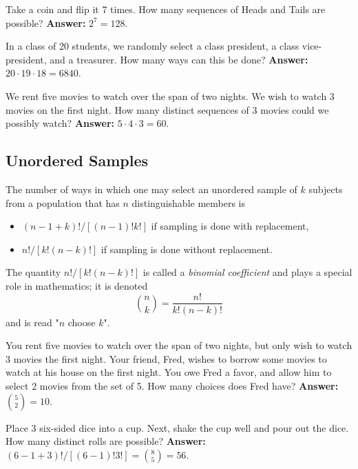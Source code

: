 Take a coin and flip it 7 times. How many sequences of Heads and Tails
are possible? \textbf{Answer:} \(2^{7}=128\).



In a class of 20 students, we randomly select a class president, a
class vice-president, and a treasurer. How many ways can this be
done? \textbf{Answer:} \(20\cdot19\cdot18=6840\).



We rent five movies to watch over the span of two nights. We wish to
watch 3 movies on the first night. How many distinct sequences of 3
movies could we possibly watch? \textbf{Answer:} \(5\cdot4\cdot3=60\).

\subsection{Unordered Samples}
\label{sec-4-5-2}

\begin{prop}
The number of ways in which one may select an unordered sample of
\(k\) subjects from a population that has \(n\) distinguishable
members is
\begin{itemize}
\item \((n-1+k)!/[(n-1)!k!]\) if sampling is done with replacement,
\item \(n!/[k!(n-k)!]\) if sampling is done without replacement.
\end{itemize}
\end{prop}

The quantity \(n!/[k!(n-k)!]\) is called a \emph{binomial coefficient} and
plays a special role in mathematics; it is denoted  
\begin{equation}
\label{eq-binomial-coefficient}
{n \choose k}=\frac{n!}{k!(n-k)!}
\end{equation}
and is read "\(n\) choose \(k\)".


You rent five movies to watch over the span of two nights, but only
wish to watch 3 movies the first night. Your friend, Fred, wishes to
borrow some movies to watch at his house on the first night. You owe
Fred a favor, and allow him to select 2 movies from the set of 5. How
many choices does Fred have? \textbf{Answer:} \({5 \choose 2}=10\).



Place 3 six-sided dice into a cup. Next, shake the cup well and pour
out the dice. How many distinct rolls are possible? \textbf{Answer:}
\((6-1+3)!/[(6-1)!3!]={8 \choose 5}=56\).

